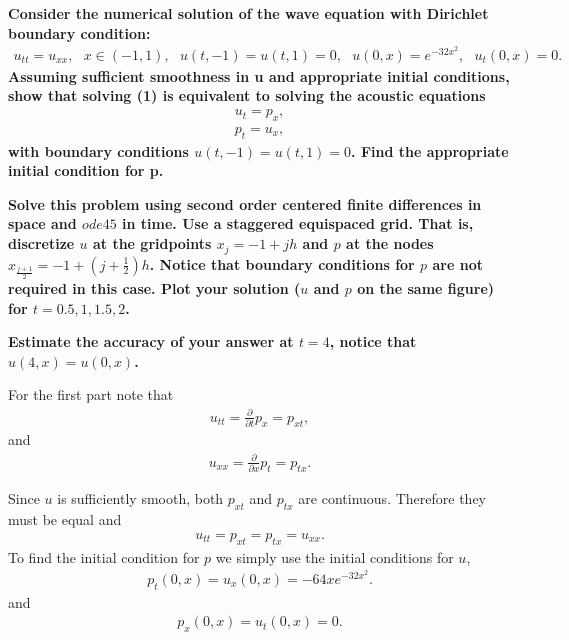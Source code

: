 \textbf{Consider the numerical solution of the wave equation with Dirichlet boundary condition:
\begin{align*}
u_{tt} = u_{xx},~~~ x\in (−1, 1),~~~ u(t, −1) = u(t, 1) = 0,~~~ u(0, x) = e^{-32x^2},~~~ u_t(0, x) = 0.
\end{align*}
Assuming sufficient smoothness in u and appropriate initial conditions, show that solving (1) is equivalent to solving the acoustic equations
\begin{align*}
u_t = p_x,\\
p_t = u_x,
\end{align*}
with boundary conditions $u(t, −1) = u(t, 1) = 0$. Find the appropriate initial condition for p.}

\textbf{Solve this problem using second order centered finite differences in space and $ode45$ in time. Use a staggered equispaced grid. That is, discretize $u$ at the gridpoints $x_j = −1 + jh$ and $p$ at the nodes $x_{\frac{j+1}{2}}= −1 + (j+\frac{1}{2})h$. Notice that boundary conditions for $p$ are not required in this case. Plot your solution ($u$ and $p$ on the same figure) for $t = 0.5, 1, 1.5, 2$.}

\textbf{Estimate the accuracy of your answer at $t = 4$, notice that $u(4, x) = u(0, x)$.}

\vspace{0.3in}

For the first part note that
\begin{align*}
u_{tt}=\frac{\partial}{\partial t}p_x=p_{xt},
\end{align*}
and
\begin{align*}
u_{xx}=\frac{\partial}{\partial x}p_t=p_{tx}.
\end{align*}

Since $u$ is sufficiently smooth, both $p_{xt}$ and $p_{tx}$ are continuous. Therefore they must be equal and
\begin{align*}
u_{tt}=p_{xt}=p_{tx}=u_{xx}.
\end{align*}
To find the initial condition for $p$ we simply use the initial conditions for $u$,
\begin{align*}
p_t(0,x)=u_x(0,x)=-64xe^{-32x^2}.
\end{align*}
and
\begin{align*}
p_x(0,x)=u_t(0,x)=0.
\end{align*}

